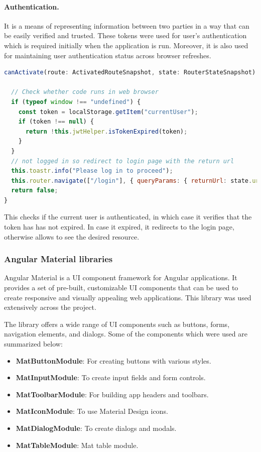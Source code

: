 \documentclass[multi, tikz, a4paper, oneside]{article}
\begin{document}
\paragraph{Authentication.}
It is a means of representing information between two parties in a way that can
be easily verified and trusted. These tokens were used for user's authentication
which is required initially when the application is run. Moreover, it is also
used for maintaining user authentication status across browser refreshes.

\begin{lstlisting}[language=JavaScript, caption={JWT guard example}, breaklines=true, label={code:guard}]
canActivate(route: ActivatedRouteSnapshot, state: RouterStateSnapshot) {

  // Check whether code runs in web browser
  if (typeof window !== "undefined") {
    const token = localStorage.getItem("currentUser");
    if (token !== null) {
      return !this.jwtHelper.isTokenExpired(token);
    }
  }
  // not logged in so redirect to login page with the return url
  this.toastr.info("Please log in to proceed");
  this.router.navigate(["/login"], { queryParams: { returnUrl: state.url } });
  return false;
}
\end{lstlisting}

This checks if the current user is authenticated, in which case it verifies that
the token has has not expired. In case it expired, it redirects to the login
page, otherwise allows to see the desired resource.

\subsubsection{Angular Material libraries}
Angular Material is a UI component framework for Angular applications. It
provides a set of pre-built, customizable UI components that can be used to
create responsive and visually appealing web applications. This library was used
extensively across the project.

The library offers a wide range of UI components such as buttons, forms,
navigation elements, and dialogs. Some of the components which were used are
summarized below:

\begin{itemize}
\item \textbf{MatButtonModule}: For creating buttons with various styles.
\item \textbf{MatInputModule}: To create input fields and form controls.
\item \textbf{MatToolbarModule}: For building app headers and toolbars.
\item \textbf{MatIconModule}: To use Material Design icons.
\item \textbf{MatDialogModule}: To create dialogs and modals.
\item \textbf{MatTableModule}: Mat table module.
\end{itemize}
\end{document}
